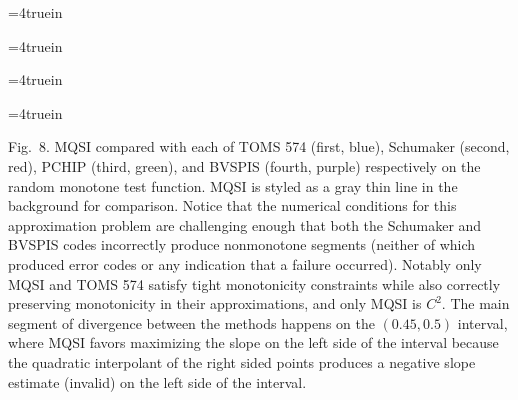 \topinsert
\centerline{\epsfxsize=4truein }
\centerline{\epsfxsize=4truein }
\centerline{\epsfxsize=4truein }
\centerline{\epsfxsize=4truein }
\beginred
{\narrower\noindent\rmVIII Fig.\ 8.
{\ttVIII MQSI} compared with each of TOMS 574 (first, blue), Schumaker
(second, red), {\ttVIII PCHIP} (third, green), and {\ttVIII BVSPIS}
(fourth, purple) respectively on the {\itVIII random monotone} test
function. {\ttVIII MQSI} is styled as a gray thin line in the
background for comparison. Notice that the numerical conditions for
this approximation problem are challenging enough that both the
Schumaker and {\ttVIII BVSPIS} codes incorrectly produce nonmonotone
segments (neither of which produced error codes or any indication that
a failure occurred). Notably only {\ttVIII MQSI} and TOMS 574 satisfy
tight monotonicity constraints while also correctly preserving
monotonicity in their approximations, and only {\ttVIII MQSI} is
$C^2$. The main segment of divergence between the methods happens on
the $(0.45, 0.5)$ interval, where {\ttVIII MQSI} favors maximizing the
slope on the left side of the interval because the quadratic
interpolant of the right sided points produces a negative
slope estimate (invalid) on the left side of the interval.
\par}
\endred
\endinsert

\endred
